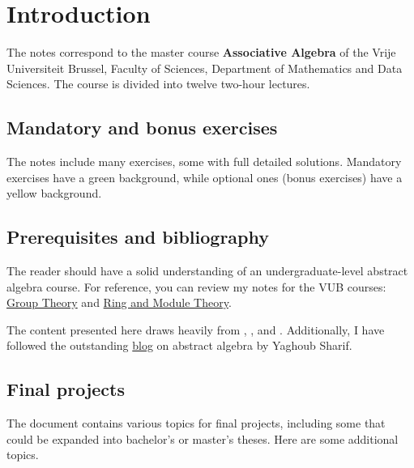 \thispagestyle{plain}
\section*{Introduction}

The notes correspond to the master  
course \textbf{Associative Algebra} of the 
Vrije Universiteit Brussel, 
Faculty of Sciences, 
Department of Mathematics and Data Sciences. The course
is divided into twelve two-hour lectures. 

\subsection*{Mandatory and bonus exercises}

The notes include many exercises, some with full detailed solutions. Mandatory exercises have a \colorbox{green!5!white}{green background}, while optional ones (bonus exercises) have a \colorbox{yellow!15!white}{yellow background}.

\subsection*{Prerequisites and bibliography}

The reader should have a solid understanding of an undergraduate-level abstract algebra course. For reference, you can review my notes for the VUB courses: \href{https://github.com/vendramin/group}{Group Theory} and \href{https://github.com/vendramin/rings}{Ring and Module Theory}.

The content presented here draws heavily from \cite{MR3308118}, \cite{MR1449137}, 
and \cite{MR798076}. Additionally, I have 
followed the outstanding \href{https://ysharifi.wordpress.com}{blog} on 
abstract algebra by Yaghoub Sharif.


\subsection*{Final projects} 

The document contains various topics for final projects, including some that could be expanded into bachelor's or master's theses. Here are some additional topics.



